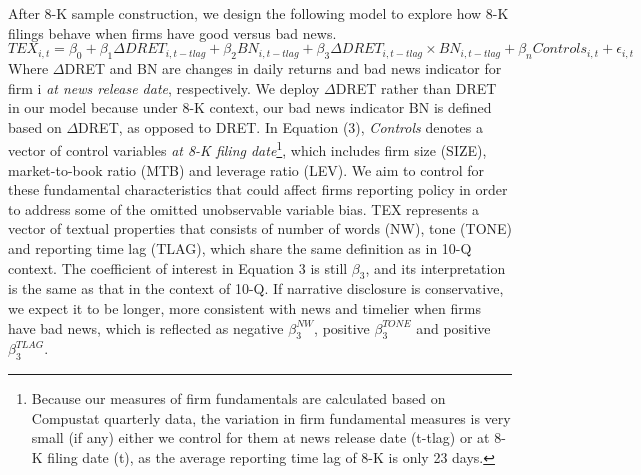 \documentclass[a4paper]{article}
\begin{document}
\begin{spacing}{2}
After 8-K sample construction, we design the following model to explore how 8-K filings behave when firms have good versus bad news.
\begin{equation} \label{eq3}
TEX_{i,t}=\beta_0+\beta_1\Delta DRET_{i,t-tlag}+\beta_2BN_{i,t-tlag}+\beta_3\Delta DRET_{i,t-tlag}\times BN_{i,t-tlag}+\beta_nControls_{i,t}+\epsilon_{i,t}
\end{equation}
Where $\Delta$DRET and BN are changes in daily returns and bad news indicator for firm i \textit{at news release date}, respectively. We deploy $\Delta$DRET rather than DRET in our model because under 8-K context, our bad news indicator BN is defined based on $\Delta$DRET, as opposed to DRET. In Equation (3), \textit{Controls} denotes a vector of control variables \textit{at 8-K filing date}\footnote{Because our measures of firm fundamentals are calculated based on Compustat quarterly data, the variation in firm fundamental measures is very small (if any) either we control for them at news release date (t-tlag) or at 8-K filing date (t), as the average reporting time lag of 8-K is only 23 days.}, which includes firm size (SIZE), market-to-book ratio (MTB) and leverage ratio (LEV). We aim to control for these fundamental characteristics that could affect firms reporting policy in order to address some of the omitted unobservable variable bias. TEX represents a vector of textual properties that consists of number of words (NW), tone (TONE) and reporting time lag (TLAG), which share the same definition as in 10-Q context. The coefficient of interest in Equation 3 is still $\beta_3$, and its interpretation is the same as that in the context of 10-Q. If narrative disclosure is conservative, we expect it to be longer, more consistent with news and timelier when firms have bad news, which is reflected as negative $\beta_3^{NW}$, positive  $\beta_3^{TONE}$ and positive $\beta_3^{TLAG}$.


\end{spacing}
\end{document}
